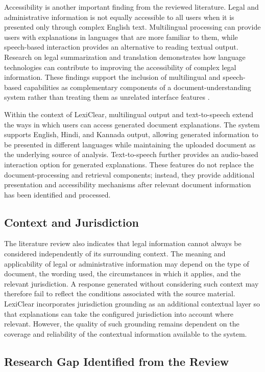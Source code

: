 \documentclass[12pt,a4paper,oneside]{report}
\begin{document}
Accessibility is another important finding from the reviewed literature.
Legal and administrative information is not equally accessible to all users
when it is presented only through complex English text. Multilingual
processing can provide users with explanations in languages that are more
familiar to them, while speech-based interaction provides an alternative to
reading textual output. Research on legal summarization and translation
demonstrates how language technologies can contribute to improving the
accessibility of complex legal information. These findings support the
inclusion of multilingual and speech-based capabilities as complementary
components of a document-understanding system rather than treating them as
unrelated interface features
\cite{ash2024translating}.

Within the context of LexiClear, multilingual output and text-to-speech
extend the ways in which users can access generated document explanations.
The system supports English, Hindi, and Kannada output, allowing generated
information to be presented in different languages while maintaining the
uploaded document as the underlying source of analysis. Text-to-speech
further provides an audio-based interaction option for generated
explanations. These features do not replace the document-processing and
retrieval components; instead, they provide additional presentation and
accessibility mechanisms after relevant document information has been
identified and processed.

\subsection{Context and Jurisdiction}

The literature review also indicates that legal information cannot always be
considered independently of its surrounding context. The meaning and
applicability of legal or administrative information may depend on the type
of document, the wording used, the circumstances in which it applies, and the
relevant jurisdiction. A response generated without considering such
context may therefore fail to reflect the conditions associated with the
source material. LexiClear incorporates jurisdiction grounding as an
additional contextual layer so that explanations can take the configured
jurisdiction into account where relevant. However, the quality of such
grounding remains dependent on the coverage and reliability of the contextual
information available to the system.

\subsection{Research Gap Identified from the Review}
\end{document}
